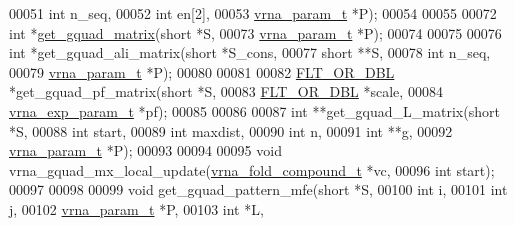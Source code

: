 \begin{DoxyCode}
00051                     \textcolor{keywordtype}{int}           n\_seq,
00052                     \textcolor{keywordtype}{int}           en[2],
00053                     \hyperlink{group__energy__parameters_structvrna__param__s}{vrna\_param\_t}  *P);
00054 
00055 
00072 \textcolor{keywordtype}{int} *\hyperlink{group__gquads_ga392e45c9615aa123737671603fa4203c}{get\_gquad\_matrix}(\textcolor{keywordtype}{short}         *S,
00073                       \hyperlink{group__energy__parameters_structvrna__param__s}{vrna\_param\_t}  *P);
00074 
00075 
00076 \textcolor{keywordtype}{int} *get\_gquad\_ali\_matrix(\textcolor{keywordtype}{short}         *S\_cons,
00077                           \textcolor{keywordtype}{short}         **S,
00078                           \textcolor{keywordtype}{int}           n\_seq,
00079                           \hyperlink{group__energy__parameters_structvrna__param__s}{vrna\_param\_t}  *P);
00080 
00081 
00082 \hyperlink{group__data__structures_ga31125aeace516926bf7f251f759b6126}{FLT\_OR\_DBL} *get\_gquad\_pf\_matrix(\textcolor{keywordtype}{short}             *S,
00083                                 \hyperlink{group__data__structures_ga31125aeace516926bf7f251f759b6126}{FLT\_OR\_DBL}        *scale,
00084                                 \hyperlink{group__energy__parameters_structvrna__exp__param__s}{vrna\_exp\_param\_t}  *pf);
00085 
00086 
00087 \textcolor{keywordtype}{int} **get\_gquad\_L\_matrix(\textcolor{keywordtype}{short}        *S,
00088                          \textcolor{keywordtype}{int}          start,
00089                          \textcolor{keywordtype}{int}          maxdist,
00090                          \textcolor{keywordtype}{int}          n,
00091                          \textcolor{keywordtype}{int}          **g,
00092                          \hyperlink{group__energy__parameters_structvrna__param__s}{vrna\_param\_t} *P);
00093 
00094 
00095 \textcolor{keywordtype}{void}        vrna\_gquad\_mx\_local\_update(\hyperlink{group__fold__compound_structvrna__fc__s}{vrna\_fold\_compound\_t} *vc,
00096                                        \textcolor{keywordtype}{int}                  start);
00097 
00098 
00099 \textcolor{keywordtype}{void} get\_gquad\_pattern\_mfe(\textcolor{keywordtype}{short}        *S,
00100                            \textcolor{keywordtype}{int}          i,
00101                            \textcolor{keywordtype}{int}          j,
00102                            \hyperlink{group__energy__parameters_structvrna__param__s}{vrna\_param\_t} *P,
00103                            \textcolor{keywordtype}{int}          *L,

\end{DoxyCode}
